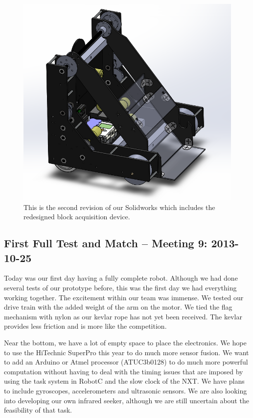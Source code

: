 \begin{center}
\begin{figure}[h]
\includegraphics[scale=0.75]{images/RobotV2.png}
\caption{This is the second revision of our Solidworks which includes the redesigned block acquisition device.}
\end{figure}
\end{center}

\newpage \subsection{First Full Test and Match -- Meeting 9: 2013-10-25}
Today was our first day having a fully complete robot. Although we had done several tests of our prototype before, this was the first day we had everything working together. The excitement within our team was immense. We tested our drive train with the added weight of the arm on the motor. We tied the flag mechanism with nylon as our kevlar rope has not yet been received. The kevlar provides less friction and is more like the competition.

Near the bottom, we have a lot of empty space to place the electronics. We hope to use the HiTechnic SuperPro this year to do much more sensor fusion. We want to add an Arduino or Atmel processor (ATUC3b0128) to do much more powerful computation without having to deal with the timing issues that are imposed by using the task system in RobotC and the slow clock of the NXT. We have plans to include gyroscopes, accelerometers and ultrasonic sensors. We are also looking into developing our own infrared seeker, although we are still uncertain about the feasibility of that task. 

